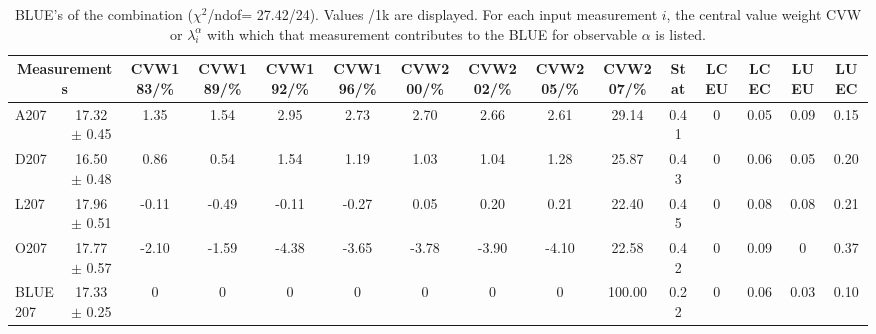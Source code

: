 \begin{table}[H]
\scriptsize
\begin{center}
\renewcommand{\arraystretch}{1.1}
\begin{tabular}{|lc|c|c|c|c|c|c|c|c|ccccc|}
\hline
\multicolumn{2}{|c|}{Measurements} & CVW{\tiny 183}/\%  & CVW{\tiny 189}/\%  & CVW{\tiny 192}/\%  & CVW{\tiny 196}/\%  & CVW{\tiny 200}/\%  & CVW{\tiny 202}/\%  & CVW{\tiny 205}/\%  & CVW{\tiny 207}/\%  & {\tiny Stat} & {\tiny LCEU} & {\tiny LCEC} & {\tiny LUEU} & {\tiny LUEC}\\
\hline
A207 &      17.32 $\pm$       0.45 &       1.35 &       1.54 &       2.95 &       2.73 &       2.70 &       2.66 &       2.61 &      29.14 &       0.41 &  0 &       0.05 &       0.09 &       0.15\\
D207 &      16.50 $\pm$       0.48 &       0.86 &       0.54 &       1.54 &       1.19 &       1.03 &       1.04 &       1.28 &      25.87 &       0.43 &  0 &       0.06 &       0.05 &       0.20\\
L207 &      17.96 $\pm$       0.51 &      -0.11 &      -0.49 &      -0.11 &      -0.27 &       0.05 &       0.20 &       0.21 &      22.40 &       0.45 &  0 &       0.08 &       0.08 &       0.21\\
O207 &      17.77 $\pm$       0.57 &      -2.10 &      -1.59 &      -4.38 &      -3.65 &      -3.78 &      -3.90 &      -4.10 &      22.58 &       0.42 &  0 &       0.09 &  0 &       0.37\\
\hline
BLUE {\tiny 207} &      17.33 $\pm$       0.25 &  0 &  0 &  0 &  0 &  0 &  0 &  0 &     100.00 &       0.22 &  0 &       0.06 &       0.03 &       0.10\\
\hline
\end{tabular}
\caption{BLUE's of the combination ($\chi^2$/ndof=     27.42/24).
 Values /1k are displayed. For each input measurement $i$, the central value weight CVW or $\lambda_i^\alpha$ with which that measurement contributes to the BLUE for observable $\alpha$ is listed.}
\renewcommand{\arraystretch}{1}
\end{center}
\end{table}
